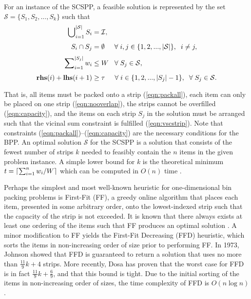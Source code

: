 \documentclass[runningheads]{llncs}
\begin{document}
For an instance of the SCSPP, a feasible solution is represented by the set $\mathcal{S} = \{S_1, S_2, ..., S_k\}$ such that
\begin{subequations}
	\begin{align}
		\bigcup\nolimits_{i=1}^{|\mathcal{S}|} S_i &= \mathcal{I}, \label{eqn:packall}\\[3pt]
		S_i \cap S_j &= \emptyset \hspace{5mm} \forall \hspace{1mm} i, j \in \{1, 2, ..., |\mathcal{S}|\}, \hspace{2mm} i \neq j, \label{eqn:nooverlap} \\[3pt]
		\sum\nolimits_{i=1}^{|S_j|}w_i & \leq W \hspace{3mm} \forall \hspace{1mm} S_j \in \mathcal{S}, \label{eqn:capacity} \\[3pt]
		\textup{\textbf{rhs}}(i) + \textup{\textbf{lhs}}(i+1) &\geq \tau \hspace {5mm} \forall \hspace{1mm} i \in \{1, 2, ..., |S_j|-1\}, \hspace{2mm} \forall \hspace{1mm} S_j \in \mathcal{S}. \label{eqn:vscstrip}
\end{align}
\end{subequations}

\noindent That is, all items must be packed onto a strip (\ref{eqn:packall}), each item can only be placed on one strip (\ref{eqn:nooverlap}), the strips cannot be overfilled (\ref{eqn:capacity}), and the items on each strip $S_j$ in the solution must be arranged such that the vicinal sum constraint is fulfilled (\ref{eqn:vscstrip}). Note that constraints (\ref{eqn:packall})--(\ref{eqn:capacity}) are the necessary conditions for the BPP. An optimal solution $\mathcal{S}$ for the SCSPP is a solution that consists of the fewest number of strips $k$ needed to feasibly contain the $n$ items in the given problem instance. A simple lower bound for $k$ is the theoretical minimum
$t = \ceil*{\sum_{i=1}^{n}w_i / W}$ which can be computed in $O(n)$ time \cite{martello1990b}. 

Perhaps the simplest and most well-known heuristic for one-dimensional bin packing problems is First-Fit (FF), a greedy online algorithm that places each item, presented in some arbitrary order, onto the lowest-indexed strip such that the capacity of the strip is not exceeded. It is known that there always exists at least one ordering of the items such that FF produces an optimal solution \cite{lewis2009}. A minor modification to FF yields the First-Fit Decreasing (FFD) heuristic, which sorts the items in non-increasing order of size prior to performing FF. In 1973, Johnson \cite{johnson1973} showed that FFD is guaranteed to return a solution that uses no more than $\frac{11}{9}k + 4$ strips. More recently, Dosa \cite{dosa2007} has proven that the worst case for FFD is in fact $\frac{11}{9}k + \frac{6}{9}$, and that this bound is tight. Due to the initial sorting of the items in non-increasing order of sizes, the time complexity of FFD is $O(n\log n)$.
\end{document}
